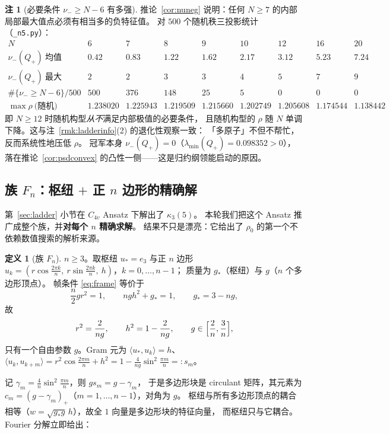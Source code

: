 \documentclass[UTF8,11pt]{ctexart}
\theoremstyle{definition}
\newtheorem{definition}[theorem]{定义}
\newtheorem{remark}[theorem]{注}
\begin{document}
\begin{remark}[必要条件 $\nu_-\ge N-6$ 有多强]\label{rmk:nunegstat}
推论~\ref{cor:nuneg} 说明：任何 $N\ge7$ 的内部局部最大值点必须有相当多的负特征值。
对 $500$ 个随机秩三投影统计（\texttt{\_n5.py}）：
\[
\begin{array}{c|cccccccc}
N&6&7&8&9&10&12&16&20\\ \hline
\nu_-(Q_+)\ \text{均值}&0.42&0.83&1.22&1.62&2.17&3.12&5.23&7.24\\
\nu_-(Q_+)\ \text{最大}&2&2&3&3&4&5&7&9\\
\#\{\nu_-\ge N-6\}/500&500&376&148&25&5&0&0&0\\
\max\rho\ \text{(随机)}&1.238020&1.225943&1.219509&1.215660&1.202749&1.205608&1.174544&1.138442
\end{array}
\]
即 $N\ge12$ 时随机构型\emph{从不}满足内部极值的必要条件，
且随机构型的 $\rho$ 随 $N$ 单调下降。这与注~\ref{rmk:ladderinfo}(2) 的退化性观察一致：
「多原子」不但不帮忙，反而系统性地压低 $\rho$。
冠军本身 $\nu_-(Q_+)=0$（$\lambda_{\min}(Q_+)=0.098352>0$），
落在推论~\ref{cor:psdconvex} 的凸性一侧——这是归约纲领能启动的原因。
\end{remark}


\subsection{族 $F_n$：枢纽 $+$ 正 $n$ 边形的精确解}\label{sec:harm:Fn}

第~\ref{sec:ladder} 小节在 $C_{4v}$ Ansatz 下解出了 $\kappa_3(5)$。
本轮我们把这个 Ansatz 推广成整个族，并\textbf{对每个 $n$ 精确求解}。
结果不只是漂亮：它给出了 $\rho_0$ 的第一个不依赖数值搜索的解析来源。

\begin{definition}[族 $F_n$]\label{def:Fn}
$n\ge3$。取枢纽 $u_*=e_3$ 与正 $n$ 边形
$u_k=(r\cos\frac{2\pi k}n,\ r\sin\frac{2\pi k}n,\ h)$，$k=0,\dots,n-1$；
质量为 $g_*$（枢纽）与 $g$（$n$ 个多边形顶点）。
帧条件 \eqref{eq:frame} 等价于
\[
\frac n2gr^2=1,\qquad ngh^2+g_*=1,\qquad g_*=3-ng ,
\]
故
\[
r^2=\frac2{ng},\qquad h^2=1-\frac2{ng},\qquad g\in\Bigl[\frac2n,\frac3n\Bigr],
\]
只有一个自由参数 $g$。Gram 元为 $\langle u_*,u_k\rangle=h$、
$\langle u_k,u_{k+m}\rangle=r^2\cos\frac{2\pi m}n+h^2=1-\frac4{ng}\sin^2\frac{\pi m}n=:s_m$。
\end{definition}

记 $\gamma_m=\frac4n\sin^2\frac{\pi m}n$，则 $gs_m=g-\gamma_m$，
于是多边形块是 circulant 矩阵，其元素为 $c_m=(g-\gamma_m)_+$（$m=1,\dots,n-1$），对角为 $g$。
枢纽与所有多边形顶点的耦合相等（$w=\sqrt{g_*g}\,h$），故全 $1$ 向量是多边形块的特征向量，
而枢纽只与它耦合。Fourier 分解立即给出：
\end{document}
